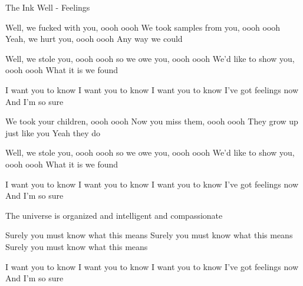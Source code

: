 The Ink Well - Feelings

Well, we fucked with you, oooh oooh
We took samples from you, oooh oooh
Yeah, we hurt you, oooh oooh
Any way we could

Well, we stole you, oooh oooh
so we owe you, oooh oooh
We'd like to show you, oooh oooh
What it is we found

I want you to know
I want you to know
I want you to know
I've got feelings now
And I'm so sure

We took your children, oooh oooh
Now you miss them, oooh oooh
They grow up just like you
Yeah they do

Well, we stole you, oooh oooh
so we owe you, oooh oooh
We'd like to show you, oooh oooh
What it is we found

I want you to know
I want you to know
I want you to know
I've got feelings now
And I'm so sure

The universe is organized 
and intelligent 
and compassionate

Surely you must know what this means
Surely you must know what this means
Surely you must know what this means

I want you to know
I want you to know
I want you to know
I've got feelings now
And I'm so sure
